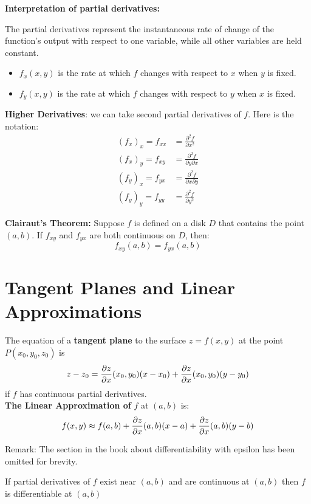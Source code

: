 \documentclass{report}
\begin{document}
\textbf{Interpretation of partial derivatives:}

The partial derivatives represent the instantaneous rate of change of the function's output with respect to one variable, while all other variables are held constant.
\begin{itemize}
    \item $f_x(x,y)$ is the rate at which $f$ changes with respect to $x$ when $y$ is fixed.
    \item $f_y(x,y)$ is the rate at which $f$ changes with respect to $y$ when $x$ is fixed.
\end{itemize}

\textbf{Higher Derivatives}: we can take second partial derivatives of $f$. Here is the notation:
\begin{align*}
(f_x)_x = f_{xx} &= \frac{\partial^2 f}{\partial x^2} \\
(f_x)_y = f_{xy} &= \frac{\partial^2 f}{\partial y \partial x} \\
(f_y)_x = f_{yx} &= \frac{\partial^2 f}{\partial x \partial y} \\
(f_y)_y = f_{yy} &= \frac{\partial^2 f}{\partial y^2}
\end{align*}


\begin{theorem}
\textbf{Clairaut's Theorem:} Suppose $f$ is defined on a disk $D$ that contains the 
point $(a, b)$. If $f_{xy}$ and $f_{yx}$ are both continuous on $D$, then: 
\[
f_{xy}(a, b) = f_{yx}(a, b)
\]
\end{theorem}

\section{Tangent Planes and Linear Approximations}

The equation of a \textbf{tangent plane} to the surface $z = f(x, y)$ at the point $P(x_0, y_0, z_0)$ is 
\[
z - z_0 = \frac{\partial z}{\partial x}(x_0, y_0) (x - x_0) + \frac{\partial z}{\partial x}(x_0, y_0) (y - y_0)
\]
if $f$ has continuous partial derivatives.
\\

\textbf{The Linear Approximation of} $f$ at $(a, b)$ is:
\[f(x, y) \approx f(a, b) + \frac{\partial z}{\partial x}(a, b) (x- a) + \frac{\partial z}{\partial x}(a, b) (y-b)\]

Remark: The section in the book about differentiability with epsilon has been omitted for brevity.

\begin{theorem}
If partial derivatives of $f$ exist near $(a, b)$ and are continuous at $(a, b)$ then $f$ is differentiable at $(a, b)$
\end{theorem}
\end{document}
